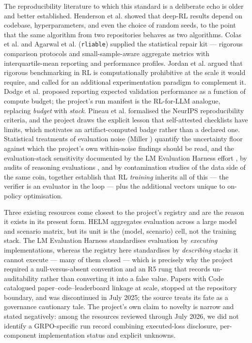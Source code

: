 \documentclass[12pt,a4paper]{report}
\begin{document}
The reproducibility literature to which this standard is a deliberate
echo is older and better established. Henderson et al.
\citep{henderson2018deep} showed that deep-RL results depend on
codebase, hyperparameters, and even the choice of random seeds, to the
point that the same algorithm from two repositories behaves as two
algorithms. Colas et al. \citep{colas2019hitchhiker} and Agarwal et al.
\citep{agarwal2021deep} (\texttt{rliable}) supplied the statistical
repair kit --- rigorous comparison protocols and small-sample-aware
aggregate metrics with interquartile-mean reporting and performance
profiles. Jordan et al. \citep{jordan2024benchmarking} argued that
rigorous benchmarking in RL is computationally prohibitive at the scale
it would require, and called for an additional experimentation paradigm
to complement it. Dodge et al. \citep{dodge2019show} proposed reporting
expected validation performance as a function of compute budget; the
project's run manifest is the RL-for-LLM analogue, replacing
\emph{budget} with \emph{stack}. Pineau et al.
\citep{pineau2021reproducibility} formalised the NeurIPS reproducibility
criteria, and the project draws the explicit lesson that self-attested
checklists have limits, which motivates an artifact-computed badge
rather than a declared one. Statistical treatments of evaluation noise
(Miller \citep{miller2024errorbars}) quantify the uncertainty floor
against which the project's own within-noise findings should be read,
and the evaluation-stack sensitivity documented by the LM Evaluation
Harness effort \citep{biderman2024lmeval}, by audits of reasoning
evaluations \citep{hochlehnert2025sober}, and by contamination studies
of the data side of the same coin, together establish that RL
\emph{training} inherits all of this --- the verifier is an evaluator in
the loop --- plus the additional vectors unique to on-policy
optimisation.

Three existing resources come closest to the project's registry and are
the reason it exists in its present form. HELM \citep{liang2022helm}
aggregates evaluation across a large model and scenario matrix, but its
unit is the (model, scenario) cell, not the training stack. The LM
Evaluation Harness \citep{biderman2024lmeval} standardises evaluation by
\emph{executing} implementations, whereas the registry here standardises
by \emph{describing} stacks it cannot execute --- many of them closed
--- which is precisely why the project required a null-versus-absent
convention and an R5 rung that records un-auditability rather than
converting it into a false value. Papers with Code catalogued
paper--code--leaderboard linkage at scale, stopped at the repository
boundary, and was discontinued in July 2025; the source treats its fate
as a governance cautionary tale. The project's own claim to novelty is
narrow and stated negatively: among the resources reviewed through July
2026, we did not identify a GRPO-specific run record combining
executed-loss disclosure, per-component implementation status and
explicit unknowns.
\end{document}
